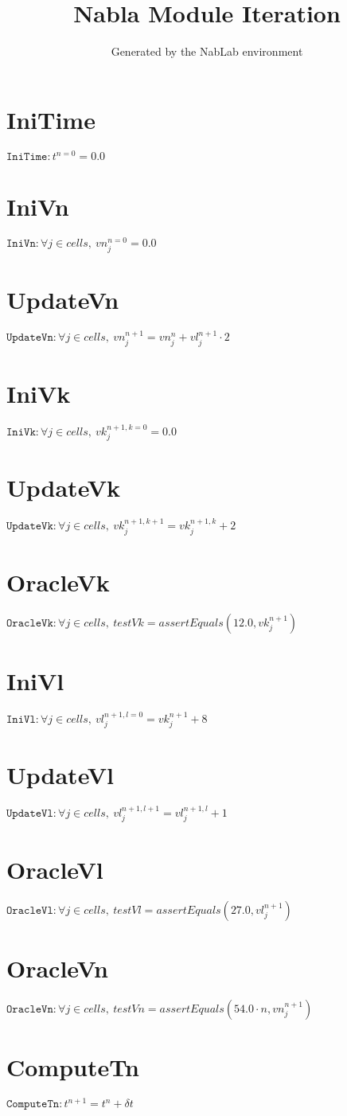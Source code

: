 \documentclass[11pt]{article}
\title{Nabla Module Iteration}
\author{Generated by the NabLab environment}
\begin{document}
\maketitle


\section{IniTime}
$\texttt{IniTime} : t^{n=0} = 0.0$


\section{IniVn}
$\texttt{IniVn} : \forall{j\in cells}, \ vn^{n=0}_{j} = 0.0$


\section{UpdateVn}
$\texttt{UpdateVn} : \forall{j\in cells}, \ vn^{n+1}_{j} = vn^{n}_{j} + vl^{n+1}_{j} \cdot 2$


\section{IniVk}
$\texttt{IniVk} : \forall{j\in cells}, \ vk^{n+1, k=0}_{j} = 0.0$


\section{UpdateVk}
$\texttt{UpdateVk} : \forall{j\in cells}, \ vk^{n+1, k+1}_{j} = vk^{n+1, k}_{j} + 2$


\section{OracleVk}
$\texttt{OracleVk} : \forall{j\in cells}, \ testVk=assertEquals\left(12.0,vk^{n+1}_{j}\right)$


\section{IniVl}
$\texttt{IniVl} : \forall{j\in cells}, \ vl^{n+1, l=0}_{j} = vk^{n+1}_{j} + 8$


\section{UpdateVl}
$\texttt{UpdateVl} : \forall{j\in cells}, \ vl^{n+1, l+1}_{j} = vl^{n+1, l}_{j} + 1$


\section{OracleVl}
$\texttt{OracleVl} : \forall{j\in cells}, \ testVl=assertEquals\left(27.0,vl^{n+1}_{j}\right)$


\section{OracleVn}
$\texttt{OracleVn} : \forall{j\in cells}, \ testVn=assertEquals\left(54.0 \cdot n,vn^{n+1}_{j}\right)$


\section{ComputeTn}
$\texttt{ComputeTn} : t^{n+1} = t^{n} + \delta t$
\end{document}
